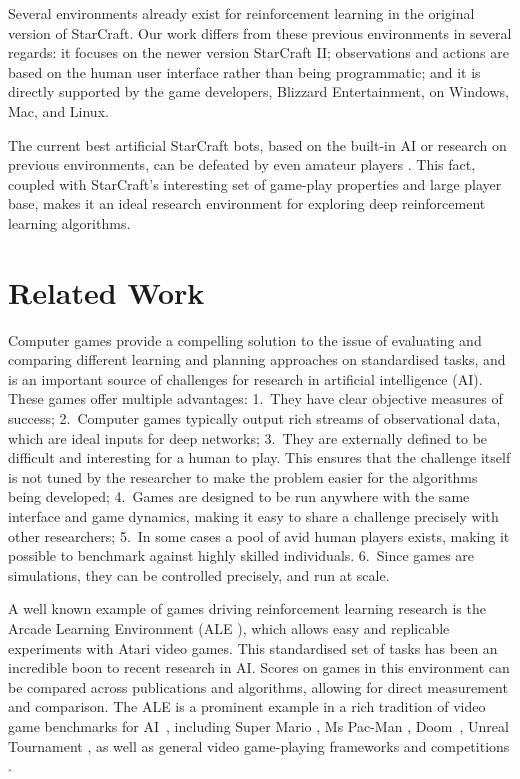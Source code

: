 \documentclass{article}
\begin{document}
Several environments \cite{BWAPI, Tian:2017elf, synnaeve2016torchcraft} already exist for reinforcement learning in the original version of StarCraft. Our work differs from these previous environments in several regards: it focuses on the newer version StarCraft II; observations and actions are based on the human user interface rather than being programmatic; and it is directly supported by the game developers, Blizzard Entertainment, on Windows, Mac, and Linux.

The current best artificial StarCraft bots, based on the built-in AI or research on previous environments, can be defeated by even amateur players \cite[cf.][and later versions of the AIIDE competition]{Buro:2012real}. This fact, coupled with StarCraft's interesting set of game-play properties and large player base, makes it an ideal research environment for exploring deep reinforcement learning algorithms.
 \section{Related Work}

Computer games provide a compelling solution to the issue of evaluating and comparing different learning and planning approaches on standardised tasks, and is an important source of challenges for research in artificial intelligence (AI).  These games offer multiple advantages: 1.\ They have clear objective measures of success; 2.\ Computer games typically output rich streams of observational data, which are ideal inputs for deep networks; 3.\ They are externally defined to be difficult and interesting for a human to play.  This ensures that the challenge itself is not tuned by the researcher to make the problem easier for the algorithms being developed; 4.\ Games are designed to be run anywhere with the same interface and game dynamics, making it easy to share a challenge precisely with other researchers;  5.\ In some cases a pool of avid human players exists, making it possible to benchmark against highly skilled individuals. 6.\ Since games are simulations, they can be controlled precisely, and run at scale.

A well known example of games driving reinforcement learning research is the Arcade Learning Environment (ALE \cite{bellemare2013arcade}), which allows easy and replicable experiments with Atari video games.  This standardised set of tasks has been an incredible boon to recent research in AI.  Scores on games in this environment can be compared across publications and algorithms, allowing for direct measurement and comparison.
The ALE is a prominent example in a rich tradition of video game benchmarks for AI~\cite{measuring:2011}, including Super Mario \cite{supermario}, Ms Pac-Man \cite{rohlfshagen2011ms}, Doom~\cite{vizdoom}, Unreal Tournament \cite{hingston2009turing}, as well as general video game-playing frameworks \cite{schaul2013video,bhonker2016playing} and competitions \cite{perez20152014}.
\end{document}

